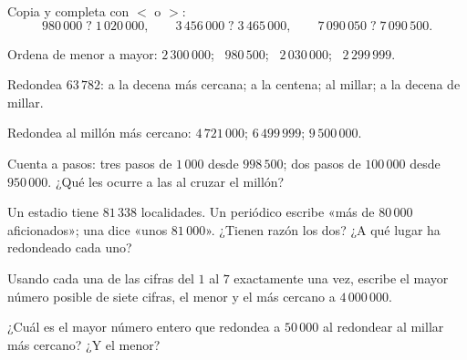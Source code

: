 \begin{exercise}[$\star$]\label{exo:g4:numbers:4}
Copia y completa con $<$ o $>$:
\[
980\,000 \;?\; 1\,020\,000, \qquad
3\,456\,000 \;?\; 3\,465\,000, \qquad
7\,090\,050 \;?\; 7\,090\,500 .
\]
\end{exercise}

\begin{exercise}[$\star$]\label{exo:g4:numbers:5}
Ordena de menor a mayor: $2\,300\,000$; \ $980\,500$; \
$2\,030\,000$; \ $2\,299\,999$.
\end{exercise}

\begin{exercise}[$\star$]\label{exo:g4:numbers:6}
Redondea $63\,782$: a la decena más cercana; a la centena; al
millar; a la decena de millar.
\end{exercise}

\begin{exercise}[$\star$]\label{exo:g4:numbers:7}
Redondea al millón más cercano: $4\,721\,000$; \quad $6\,499\,999$;
\quad $9\,500\,000$.
\end{exercise}

\begin{exercise}[$\star$]\label{exo:g4:numbers:8}
Cuenta a pasos: tres pasos de $1\,000$ desde $998\,500$; dos pasos
de $100\,000$ desde $950\,000$. ¿Qué les ocurre a las  al
cruzar el millón?
\end{exercise}

\begin{exercise}[$\star$]\label{exo:g4:numbers:9}
Un estadio tiene $81\,338$ localidades. Un periódico escribe «más de
$80\,000$ aficionados»; una \omterm{def:g3:shapes:shapes}{radio} dice «unos $81\,000$». ¿Tienen razón
los dos? ¿A qué lugar ha redondeado cada uno?
\end{exercise}

\begin{exercise}[$\star\star$]\label{exo:g4:numbers:10}
Usando cada una de las cifras del $1$ al $7$ exactamente una vez, escribe el mayor
número posible de siete cifras, el menor y el más cercano a
$4\,000\,000$.
\end{exercise}

\begin{exercise}[$\star\star$]\label{exo:g4:numbers:11}
¿Cuál es el mayor número entero que redondea a $50\,000$ al
redondear al millar más cercano? ¿Y el menor?
\end{exercise}
